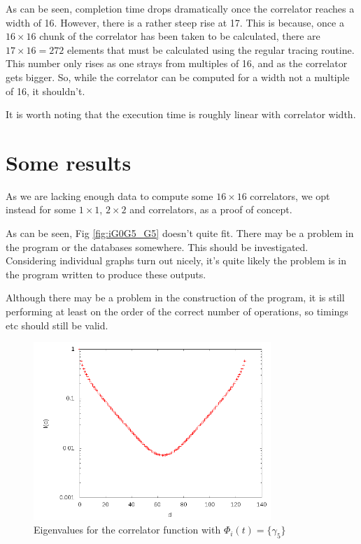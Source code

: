 \documentclass[a4paper,12pt]{report}
\begin{document}
As can be seen, completion time drops dramatically once the correlator reaches a width of 16.
However, there is a rather steep rise at 17.
This is because, once a $16 \times 16$ chunk of the correlator has been taken to be calculated, there are $17 \times 16 = 272$ elements that must be calculated using the regular tracing routine.
This number only rises as one strays from multiples of 16, and as the correlator gets bigger.
So, while the correlator can be computed for a width not a multiple of 16, it shouldn't.

It is worth noting that the execution time is roughly linear with correlator width.


\section{Some results}
As we are lacking enough data to compute some $16 \times 16$ correlators, we opt instead for some $1 \times 1$, $2 \times 2$ and correlators, as a proof of concept.

As can be seen, Fig \ref{fig:iG0G5_G5} doesn't quite fit. There may be a problem in the program or the databases somewhere.
This should be investigated.
Considering individual graphs turn out nicely, it's quite likely the problem is in the program written to produce these outputs.

Although there may be a problem in the construction of the program, it is still performing at least on the order of the correct number of operations, so timings etc should still be valid.

\begin{figure}
\centering
	\includegraphics[width=0.8\textwidth] {images/Maths_Project_G5}
\caption{Eigenvalues for the correlator function with $\Phi_i(t) = \{\gamma_5\}$}
\end{figure}
\end{document}
